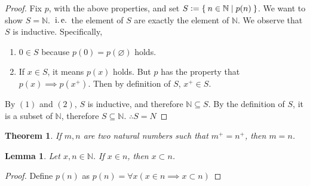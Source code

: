 \documentclass[12pt]{amsart}
\newcommand{\bbN}{\mathbb{N}}
\newcommand{\ie}{\operatorname{\thinspace i.e. \thinspace}}
\theoremstyle{plain}
\newtheorem*{thm}{Theorem}
\newtheorem*{lem}{Lemma}
\theoremstyle{remark}
\theoremstyle{definition}
\begin{document}
\begin{proof}
	Fix $p$, with the above properties, and set $S \vcentcolon = \Set{n \in \bbN | p(n)}$. We want to show $S = \bbN$. $\ie$ the element of $S$ are exactly the element of $\bbN$.
	\newline
	We observe that $S$ is inductive. Specifically,
	\begin{enumerate}[(1)]
		\item $0 \in S$ because $p(0) = p(\varnothing)$ holds.
		\item If $x \in S$, it means $p(x)$ holds. But $p$ has the property that $p(x) \implies p(x^+)$. Then by definition of $S$, $x^+ \in S$.
	\end{enumerate}
	By $(1)$ and $(2)$, $S$ is inductive, and therefore $\bbN \subseteq S$.
	By the definition of $S$, it is a subset of $\bbN$, therefore $S \subseteq \bbN$.
	\newline
	$\therefore S = N$ 
\end{proof}

\begin{thm}
	If $m, n$ are two natural numbers such that $m^+ = n^+$, then $m = n$.
\end{thm}

\begin{lem}
	Let $x, n \in \bbN$. If $x \in n$, then $x \subset n$.
\end{lem}
\begin{proof}
	Define $p(n)$ as $p(n) = \forall x(x\in n \implies x \subset n)$
\end{proof}
\end{document}
